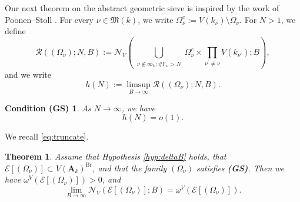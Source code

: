 \documentclass[11pt,letterpaper]{amsart}
\newcommand{\BF}{{\mathbb {F}}}
\newcommand{\CE}{{\mathcal {E}}}
\newcommand{\CN}{{\mathcal {N}}}
\newcommand{\CR}{{\mathcal {R}}}
\newcommand{\RA}{{\mathbf {A}}}
\theoremstyle{plain}
\numberwithin{equation}{section}
\newtheorem{theorem}{Theorem}[section]
\newtheorem*{condGS}{Condition (GS)}
\theoremstyle{definition}
\theoremstyle{remark}
\begin{document}
Our next theorem on the abstract geometric sieve is inspired by the work of Poonen--Stoll \cite[Lemma 20]{Poonen-Stoll}. For every $\nu\in\mathfrak{M}(k)$, we write $\Omega_\nu^c:=V(k_\nu)\setminus \Omega_\nu$.  For $N>1$, we define
\begin{equation}\label{eq:CR}
	\CR((\Omega_\nu);N,B):=\CN_{V}\left(\bigcup_{\substack{\nu\notin\infty_k: \#\BF_\nu>N}}\Omega_{\nu}^c\times \prod_{\nu^\prime\neq \nu}V(k_{\nu^\prime});B\right), 
\end{equation} and we write
$$h(N):=\limsup_{B\to\infty} \CR((\Omega_\nu);N,B).$$
\begin{condGS}
	As $N\to\infty$, we have $$h(N)=o(1).$$ 
\end{condGS}
We recall \eqref{eq:truncate}.
\begin{theorem}\label{thm:keyOmega}
	Assume that Hypothesis \ref{hyp:deltaB} holds, that $\CE[(\Omega_{\nu})]\subset V(\RA_k)^{\operatorname{Br}}$, and that the family $(\Omega_\nu)$ satisfies \textbf{(GS)}. Then we have $\omega^V\left(\CE[(\Omega_{\nu})]\right)>0$, and \begin{equation}\label{eq:asympCS}
	\lim_{B\to\infty}\CN_V\left(\CE[(\Omega_{\nu})];B\right)=\omega^V\left(\CE[(\Omega_{\nu})]\right).
\end{equation}
\end{theorem}
\end{document}
